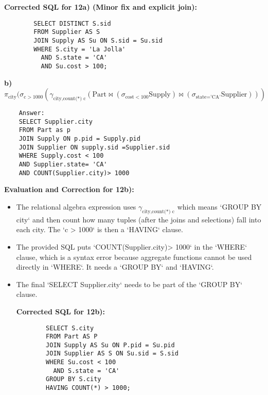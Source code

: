 \documentclass{article}
\begin{document}
\begin{enumerate}[label=\textbf{Question \arabic*.}]
\begin{itemize}
        \textbf{Corrected SQL for 12a) (Minor fix and explicit join):}
        \begin{lstlisting}
        SELECT DISTINCT S.sid
        FROM Supplier AS S
        JOIN Supply AS Su ON S.sid = Su.sid
        WHERE S.city = 'La Jolla'
          AND S.state = 'CA'
          AND Su.cost > 100;
        \end{lstlisting}
    \end{itemize}

    \textbf{b) $$\pi_{\text{city}}(\sigma_{\text{c} >1000}(\gamma_{\text{city}, \text{count(*)} \text{ c}} (\text{Part} \bowtie (\sigma_{\text{cost}<100} \text{Supply}) \bowtie (\sigma_{\text{state='CA'}} \text{Supplier})))$$}
    \begin{lstlisting}
    Answer:
    SELECT Supplier.city
    FROM Part as p
    JOIN Supply ON p.pid = Supply.pid
    JOIN Supplier ON supply.sid =Supplier.sid
    WHERE Supply.cost < 100
    AND Supplier.state= 'CA'
    AND COUNT(Supplier.city)> 1000
    \end{lstlisting}
    \textbf{Evaluation and Correction for 12b):}
    \begin{itemize}
        \item The relational algebra expression uses $\gamma_{\text{city}, \text{count(*)} \text{ c}}$ which means `GROUP BY city` and then count how many tuples (after the joins and selections) fall into each city. The `c > 1000` is then a `HAVING` clause.
        \item The provided SQL puts `COUNT(Supplier.city)> 1000` in the `WHERE` clause, which is a syntax error because aggregate functions cannot be used directly in `WHERE`. It needs a `GROUP BY` and `HAVING`.
        \item The final `SELECT Supplier.city` needs to be part of the `GROUP BY` clause.

        \textbf{Corrected SQL for 12b):}
        \begin{lstlisting}
        SELECT S.city
        FROM Part AS P
        JOIN Supply AS Su ON P.pid = Su.pid
        JOIN Supplier AS S ON Su.sid = S.sid
        WHERE Su.cost < 100
          AND S.state = 'CA'
        GROUP BY S.city
        HAVING COUNT(*) > 1000;
        \end{lstlisting}
    \end{itemize}


\end{enumerate}
\end{document}
